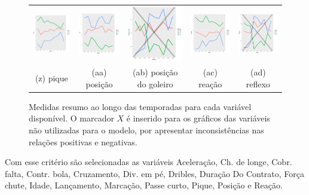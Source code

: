 \documentclass[doc,apacite,oneside,a4paper,12pt]{apa6}
\begin{document}
\begin{figure}
\begin{tabular}{ccccc}
    \includegraphics[width=25mm]{pique_result}  & \includegraphics[width=25mm]{pos_result} & \includegraphics[width=25mm]{posicion_gl_result} &     \includegraphics[width=25mm]{reacao_result}&
  \includegraphics[width=25mm]{reflexos_result}     \\
 \scriptsize{(z) pique} & \scriptsize{(aa) posição}& \scriptsize{(ab) posição do goleiro} & \scriptsize{(ac) reação} & \scriptsize{(ad) reflexo}  \\[3pt]

\end{tabular}
    \caption[\scriptsize{Medidas resumo.}]{\scriptsize{Medidas resumo ao longo das temporadas para cada variável disponível. O marcador $X$ é inserido para os gráficos das variáveis não utilizadas para o modelo, por apresentar inconsistências nas relações positivas e negativas.}}
        \label{fig:medresumo}
\end{figure}


Com esse critério são selecionadas as variáveis Aceleração, Ch. de longe, Cobr. falta, Contr. bola, Cruzamento, Div. em pé, Dribles, Duração Do Contrato, Força chute, Idade, Lançamento, Marcação, Passe curto, Pique, Posição e Reação.
\end{document}
